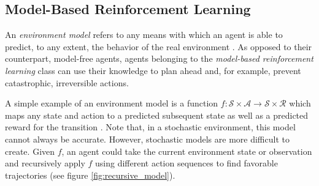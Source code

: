 \subsection{Model-Based Reinforcement Learning}
An \textit{environment model} refers to any means with which an agent is able to predict, to any extent, the behavior of the real environment \cite{bible}. As opposed to their counterpart, model-free agents, agents belonging to the \textit{model-based reinforcement learning} class can use their knowledge to plan ahead and, for example, prevent catastrophic, irreversible actions.

A simple example of an environment model is a function $f : \mathscr{S} \times \mathscr{A} \to \mathscr{S} \times \mathscr{R}$ which maps any state and action to a predicted subsequent state as well as a predicted reward for the transition \cite{model}. Note that, in a stochastic environment, this model cannot always be accurate. However, stochastic models are more difficult to create. Given $f$, an agent could take the current environment state or observation and recursively apply $f$ using different action sequences to find favorable trajectories (see figure \ref{fig:recursive_model}).
